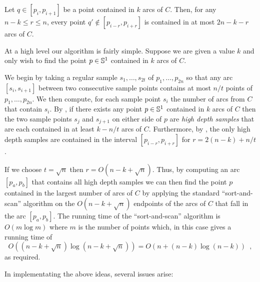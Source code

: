 \documentclass[charterfonts,lotsofwhite]{patmorin}
\begin{document}
\begin{obs}
Let $q\in[p_i,p_{i+1}]$ be a point contained in $k$ arcs of $C$.
Then, for any $n-k \le r\le n$, every point $q'\notin[p_{i-r},p_{i+r}]$ 
is contained in at most $2n-k-r$ arcs of $C$.
\end{obs}

At a high level our algorithm is fairly simple.  Suppose we are given
a value $k$ and only wish to find the point $p\in\mathbb{S}^1$
contained in $k$ arcs of $C$.

We begin by taking a regular sample $s_1,\ldots,s_{2t}$ of
$p_1,\ldots,p_{2n}$ so that any arc $[s_i,s_{i+1}]$ between two
consecutive sample points contains at most $n/t$ points of
$p_1,\ldots,p_{2n}$.  We then compute, for each sample point $s_i$ the
number of arcs from $C$ that contain $s_i$.  By , if
there exists any point $p\in \mathbb{S}^1$ contained in $k$ arcs of $C$
then the two sample points $s_j$ and $s_{j+1}$ on either side of $p$
are \emph{high depth samples} that are each contained in at least
$k-n/t$ arcs of $C$.  Furthermore, by , the only high
depth samples are contained in the interval $[p_{i-r},p_{i+r}]$ for
$r=2(n-k)+n/t$.  

If we choose $t=\sqrt{n}$ then $r=O(n-k+\sqrt{n})$.  Thus, by
computing an arc $[p_a,p_b]$ that contains all high depth samples we
can then find the point $p$ contained in the largest number of arcs of
$C$ by applying the standard ``sort-and-scan'' algorithm on the
$O(n-k+\sqrt{n})$ endpoints of the arcs of $C$ that fall in the arc 
$[p_a,p_b]$.  The running
time of the ``sort-and-scan'' algorithm is $O(m\log m)$ where $m$ is
the number of points which, in this case gives a running time of 
\[
   O((n-k+\sqrt{n})\log(n-k+\sqrt n)) = O(n + (n-k)\log (n-k)) \enspace ,
\]
as required.

In implementating the above ideas, several issues
arise:
\end{document}
